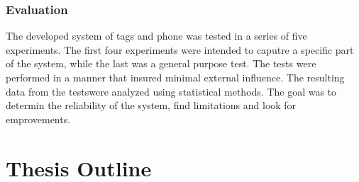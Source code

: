 \subsubsection{Evaluation}
The developed system of tags and phone was tested in a series of five experiments.
The first four experiments were intended to caputre a specific part of the system, while the last was a general purpose test.
The tests were performed in a manner that insured minimal external influence.
The resulting data from the testswere analyzed using statistical methods.
The goal was to determin the reliability of the system, find limitations and look for emprovements.

\section{Thesis Outline}


